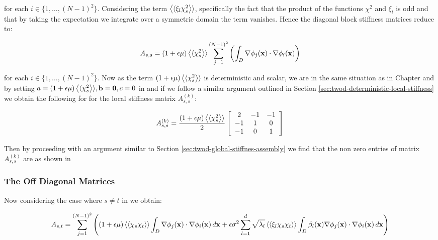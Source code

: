 for each $i \in \{1,\ldots,(N-1)^2\}$. Considering the term
$\left\langle\langle\xi_l\chi_s^2\right\rangle\rangle$, specifically the fact that the product of the
functions $\chi^2$ and $\xi_l$ is odd and that by taking the expectation we
integrate over a symmetric domain the term vanishes. Hence the diagonal block
stiffness matrices reduce to:

\begin{equation}
    A_{s,s} = (1 + \epsilon\mu)\left\langle\langle\chi_s^2\right\rangle\rangle
    \sum_{j=1}^{(N-1)^2}\left(\int_D\nabla\phi_j(\mathbf{x})\cdot\nabla\phi_i(\mathbf{x})\right)
\end{equation}

for each $i \in \{1,\ldots,(N-1)^2\}$. Now as the term $(1 +
\epsilon\mu)\left\langle\langle\chi_s^2\right\rangle\rangle$ is deterministic and scalar, we are in the same
situation as in Chapter  and by setting
$a = (1 + \epsilon\mu)\left\langle\langle\chi_s^2\right\rangle\rangle, \mathbf{b} = \mathbf{0}, c = 0$ in
 and if we follow a similar argument
outlined in Section \ref{sec:twod-deterministic-local-stiffness} we obtain the
following for for the local stiffness matrix $A^{(k)}_{s,s}$:

\begin{equation}
    A^{(k)}_{s,s} = \frac{(1 + \epsilon\mu)\left\langle\langle\chi_s^2\right\rangle\rangle}{2}
    \left[\begin{array}{c c c}
        2  & -1 & -1 \\
        -1 & 1  & 0 \\
        -1 & 0  & 1
    \end{array}\right]
\end{equation}

Then by proceeding with an argument similar to Section
\ref{sec:twod-global-stiffnes-assembly} we find that the non zero entries of
matrix $A^{(k)}_{s,s}$ are as shown in 

\subsubsection{The Off Diagonal Matrices}

Now considering the case where $s \neq t$ in 
we obtain:

\begin{equation}
    A_{s,t} = \sum_{j=1}^{(N-1)^2}\left(
(1 + \epsilon\mu)\left\langle\langle\chi_s\chi_t\right\rangle\rangle
      \int_D\nabla\phi_j(\mathbf{x})\cdot\nabla\phi_i(\mathbf{x})\, d\mathbf{x} +
      \epsilon\sigma^2\sum_{l=1}^d\sqrt{\lambda_l}\left\langle\langle\xi_l\chi_s\chi_t\right\rangle\rangle
      \int_D\beta_l(\mathbf{x})\nabla\phi_j(\mathbf{x})\cdot\nabla\phi_i(\mathbf{x})\, d\mathbf{x}
      \right)
\end{equation}

